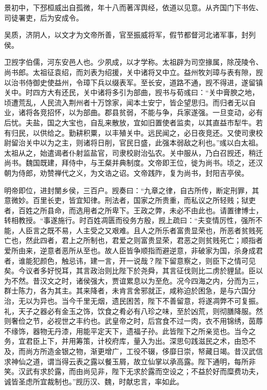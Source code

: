 \documentclass[12pt,UTF8]{ctexbook}
\begin{document}
景初中，下邳桓威出自孤微，年十八而著浑舆经，依道以见意。从齐国门下书佐、司徒署吏，后为安成令。

吴质，济阴人，以文才为文帝所善，官至振威将军，假节都督河北诸军事，封列侯。

卫觊字伯儒，河东安邑人也。少夙成，以才学称。太祖辟为司空掾属，除茂陵令、尚书郎。太祖征袁绍，而刘表为绍援，关中诸将又中立。益州牧刘璋与表有隙，觊以治书侍御史使益州，令璋下兵以缀表军。至长安，道路不通，觊不得进，遂留镇关中。时四方大有还民，关中诸将多引为部曲，觊书与荀彧曰：“关中膏腴之地，顷遭荒乱，人民流入荆州者十万馀家，闻本土安宁，皆企望思归。而归者无以自业，诸将各竞招怀，以为部曲。郡县贫弱，不能与争，兵家遂强。一旦变动，必有后忧。夫盐，国之大宝也，自乱来散放，宜如旧置使者监卖，以其直益巿犁牛。若有归民，以供给之。勤耕积粟，以丰殖关中。远民闻之，必日夜竞还。又使司隶校尉留治关中以为之主，则诸将日削，官民日盛，此强本弱敌之利也。”彧以白太祖。太祖从之，始遣谒者仆射监盐官，司隶校尉治弘农。关中服从，乃白召觊还，稍迁尚书。魏国既建，拜侍中，与王粲并典制度。文帝即王位，徙为尚书。顷之，还汉朝为侍郎，劝赞禅代之义，为文诰之诏。文帝践阼，复为尚书，封阳吉亭侯。

明帝即位，进封閺乡侯，三百户。觊奏曰：“九章之律，自古所传，断定刑罪，其意微妙。百里长吏，皆宜知律。刑法者，国家之所贵重，而私议之所轻贱；狱吏者，百姓之所县命，而选用者之所卑下。王政之弊，未必不由此也。请置律博士，转相教授。“事遂施行。时百姓凋匮而役务方殷，觊上疏曰：“夫变情厉性，强所不能，人臣言之既不易，人主受之又艰难。且人之所乐者富贵显荣也，所恶者贫贱死亡也，然此四者，君上之所制也，君爱之则富贵显荣，君恶之则贫贱死亡；顺指者爱所由来，逆意者恶所从至也。故人臣皆争顺指而避逆意，非破家为国，杀身成君者，谁能犯颜色，触忌讳，建一言，开一说哉？陛下留意察之，则臣下之情可见矣。今议者多好悦耳，其言政治则比陛下於尧舜，其言征伐则比二虏於貍鼠。臣以为不然。昔汉文之时，诸侯强大，贾谊累息以为至危。况今四海之内，分而为三，群士陈力，各为其主。其来降者，未肯言舍邪就正，咸称迫於困急，是与六国分治，无以为异也。当今千里无烟，遗民困苦，陛下不善留意，将遂凋弊不可复振。礼，天子之器必有金玉之饰，饮食之肴必有八珍之味，至於凶荒，则彻膳降服。然则奢俭之节，必视世之丰约也。武皇帝之时，后宫食不过一肉，衣不用锦绣，茵蓐不缘饰，器物无丹漆，用能平定天下，遗福子孙。此皆陛下之所亲览也。当今之务，宜君臣上下，并用筹策，计校府库，量入为出。深思句践滋民之术，由恐不及，而尚方所造金银之物，渐更增广，工役不辍，侈靡日崇，帑藏日竭。昔汉武信求神仙之道，谓当得云表之露以餐玉屑，故立仙掌以承高露。陛下通明，每所非笑。汉武有求於露，而由尚见非，陛下无求於露而空设之；不益於好而糜费功夫，诚皆圣虑所宜裁制也。”觊历汉、魏，时献忠言，率如此。
\end{document}
